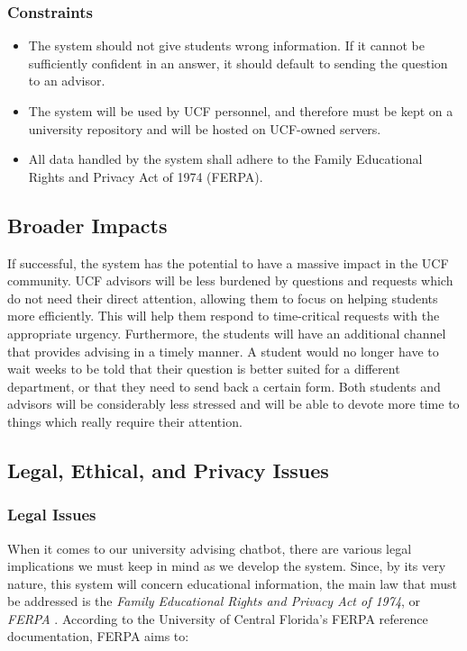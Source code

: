 \documentclass[titlepage, 12pt]{article}
\begin{document}
\subsubsection{Constraints}

\begin{itemize}
  \item The system should not give students wrong information. If it cannot be sufficiently confident in an answer, it should default to sending the question to an advisor.
  \item The system will be used by UCF personnel, and therefore must be kept on a university repository and will be hosted on UCF-owned servers.
  \item All data handled by the system shall adhere to the Family Educational Rights and Privacy Act of 1974 (FERPA).
\end{itemize}

\subsection{Broader Impacts}

If successful, the system has the potential to have a massive impact in the UCF community. UCF advisors will be less burdened by questions and requests which do not need their direct attention, allowing them to focus on helping students more efficiently. This will help them respond to time-critical requests with the appropriate urgency. Furthermore, the students will have an additional channel that provides advising in a timely manner. A student would no longer have to wait weeks to be told that their question is better suited for a different department, or that they need to send back a certain form. Both students and advisors will be considerably less stressed and will be able to devote more time to things which really require their attention.

\subsection{Legal, Ethical, and Privacy Issues}

\subsubsection{Legal Issues}

When it comes to our university advising chatbot, there are various legal implications we must keep in mind as we develop the system. Since, by its very nature, this system will concern educational information, the main law that must be addressed is the \emph{Family Educational Rights and Privacy Act of 1974}, or \emph{FERPA} \cite{bib-1-2}. According to the University of Central Florida’s FERPA reference documentation, FERPA aims to:
\end{document}
